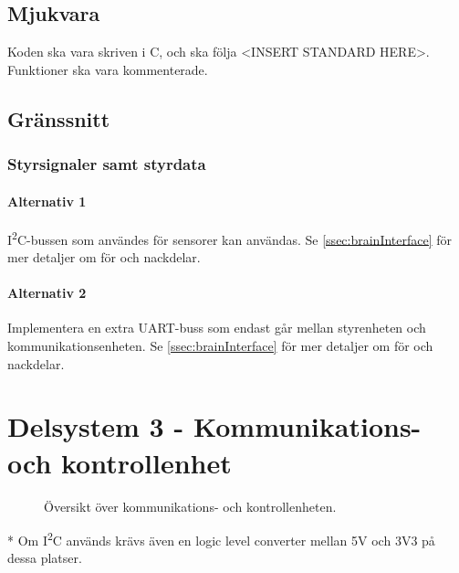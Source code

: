 \documentclass[a4paper,11pt]{article}
\begin{document}
\subsection{Mjukvara}

Koden ska vara skriven i C, och ska följa <INSERT STANDARD HERE>. Funktioner ska vara kommenterade.

\subsection{Gränssnitt} \label{ssec:controllInterface}

\subsubsection{Styrsignaler samt styrdata}

\paragraph{Alternativ 1}
I\textsuperscript{2}C-bussen som användes för sensorer kan användas. Se \ref{ssec:brainInterface} för mer detaljer om för och nackdelar.

\paragraph{Alternativ 2}
Implementera en extra UART-buss som endast går mellan styrenheten och kommunikationsenheten. Se \ref{ssec:brainInterface} för mer detaljer om för och nackdelar.

\newpage
\section{Delsystem 3 - Kommunikations- och kontrollenhet}
\begin{figure}[h!]
    \caption{Översikt över kommunikations- och kontrollenheten.  }
    \label{fig:modules}
\end{figure}
\noindent \begin{small}
* Om I\textsuperscript{2}C används krävs även en logic level converter mellan 5V och 3V3 på dessa platser.
\end{small}
\end{document}
